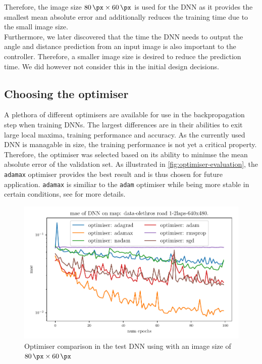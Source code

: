 \documentclass[10pt,a4paper,twoside,journal]{IEEEtran}
\begin{document}
Therefore, the image size $ \SI{80}{\px}\times\SI{60}{\px} $ is used for the DNN as it provides the smallest mean absolute error and additionally reduces the training time due to the small image size. \\

Furthermore, we later discovered that the time the DNN needs to output the angle and distance prediction from an input image is also important to the controller. Therefore, a smaller image size is desired to reduce the prediction time. We did however not consider this in the initial design decisions. 

\subsection{Choosing the optimiser}
\label{ssc:optimiser-choice}
A plethora of different optimisers are available for use in the backpropagation step when training DNNs. The largest differences are in their abilities to exit large local maxima, training performance and accuracy. As the currently used DNN is managable in size, the training performance is not yet a critical property. Therefore, the optimiser was selected based on its ability to minimse the mean absolute error of the validation set. As illustrated in \autoref{fig:optimiser-evaluation}, the \texttt{adamax} optimiser provides the best result and is thus chosen for future application. \texttt{adamax} is similiar to the \texttt{adam} optimiser while being more stable in certain conditions, see \cite{DBLP:journals/corr/KingmaB14} for more details. 

\begin{figure}[ht]
	\centering
	\includegraphics[width=\columnwidth]{attachments/alexnet-val_mae-optimiser_comp-69975-70890-71951-76023-79233-82251.pdf}
	\caption{Optimiser comparison in the test DNN using with an image size of $ \SI{80}{\px}\times\SI{60}{\px} $}
	\label{fig:optimiser-evaluation}
\end{figure}
\end{document}
